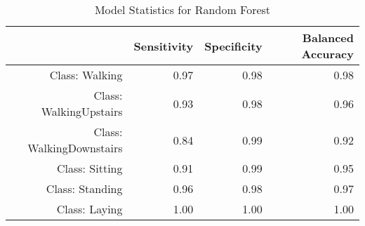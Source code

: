 \begin{table}[ht]
\centering
\caption{Model Statistics for Random Forest} 
\label{tab:conmat_stats_rf}
\begin{tabular}{rrrr}
  \hline
 & Sensitivity & Specificity & Balanced Accuracy \\ 
  \hline
Class: Walking & 0.97 & 0.98 & 0.98 \\ 
  Class: WalkingUpstairs & 0.93 & 0.98 & 0.96 \\ 
  Class: WalkingDownstairs & 0.84 & 0.99 & 0.92 \\ 
  Class: Sitting & 0.91 & 0.99 & 0.95 \\ 
  Class: Standing & 0.96 & 0.98 & 0.97 \\ 
  Class: Laying & 1.00 & 1.00 & 1.00 \\ 
   \hline
\end{tabular}
\end{table}
